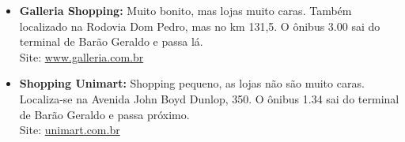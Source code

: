 \begin{itemize}
\item   \textbf{Galleria Shopping:} Muito bonito, mas lojas muito caras. Também
        localizado na Rodovia Dom Pedro, mas no km 131,5. O ônibus 3.00 sai do
        terminal de Barão Geraldo e passa lá.
        \\Site: \url{www.galleria.com.br}

\item   \textbf{Shopping Unimart:} Shopping pequeno, as lojas não são muito
        caras. Localiza-se na Avenida John Boyd Dunlop, 350. O ônibus 1.34 sai
        do terminal de Barão Geraldo e passa próximo.
        \\Site: \url{unimart.com.br}

\end{itemize}
